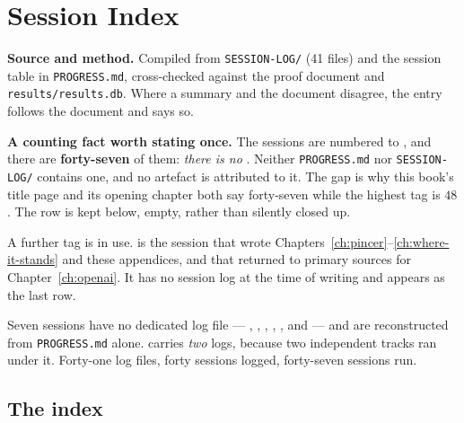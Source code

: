 \chapter{Session Index}
\label{ch:sessions}

\begin{record}
\textbf{Source and method.} Compiled from \texttt{SESSION-LOG/} (41 files) and
the session table in \texttt{PROGRESS.md}, cross-checked against the proof
document and \texttt{results/results.db}. Where a summary and the document
disagree, the entry follows the document and says so.

\smallskip
\textbf{A counting fact worth stating once.} The sessions are numbered to
, and there are \textbf{forty-seven} of them: \emph{there is no
}. Neither \texttt{PROGRESS.md} nor \texttt{SESSION-LOG/} contains one,
and no artefact is attributed to it. The gap is why this book's title page and
its opening chapter both say forty-seven while the highest tag is \(48\). The
row is kept below, empty, rather than silently closed up.

\smallskip
A further tag is in use.  is the session that wrote
Chapters~\ref{ch:pincer}--\ref{ch:where-it-stands} and these appendices, and
that returned to primary sources for Chapter~\ref{ch:openai}. It has no
session log at the time of writing and appears as the last row.

\smallskip
Seven sessions have no dedicated log file --- , , ,
, ,  and  --- and are reconstructed from
\texttt{PROGRESS.md} alone.  carries \emph{two} logs, because two
independent tracks ran under it. Forty-one log files, forty sessions logged,
forty-seven sessions run.
\end{record}

\section{The index}
\label{sec:a2-index}

